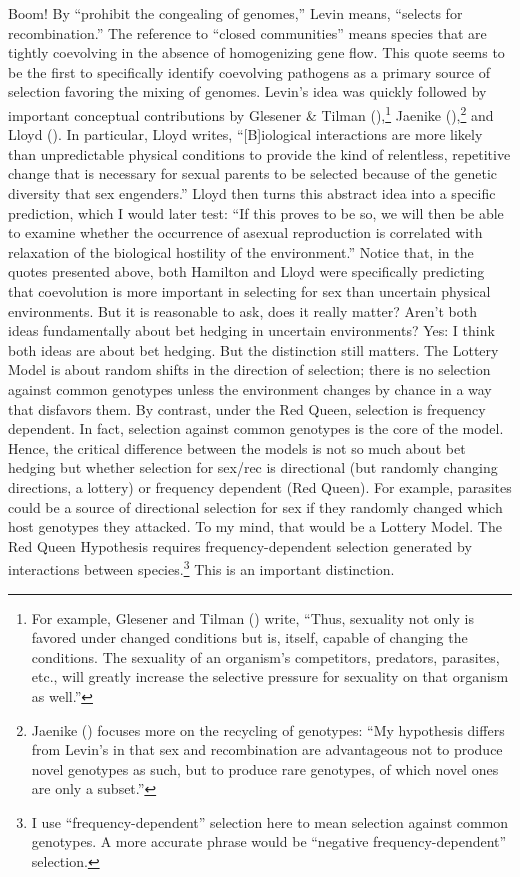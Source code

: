 \documentclass[
  letterpaper,
]{book}
\begin{document}
Boom! By ``prohibit the congealing of genomes,'' Levin means, ``selects
for recombination.'' The reference to ``closed communities'' means
species that are tightly coevolving in the absence of homogenizing gene
flow. This quote seems to be the first to specifically identify
coevolving pathogens as a primary source of selection favoring the
mixing of genomes. Levin's idea was quickly followed by important
conceptual contributions by Glesener \& Tilman
(),\footnote{For example, Glesener and
  Tilman () write, ``Thus, sexuality
  not only is favored under changed conditions but is, itself, capable
  of changing the conditions. The sexuality of an organism's
  competitors, predators, parasites, etc., will greatly increase the
  selective pressure for sexuality on that organism as well.''} Jaenike
(),\footnote{Jaenike
  () focuses more on the recycling of
  genotypes: ``My hypothesis differs from Levin's in that sex and
  recombination are advantageous not to produce novel genotypes as such,
  but to produce rare genotypes, of which novel ones are only a
  subset.''} and Lloyd (). In particular,
Lloyd writes, ``{[}B{]}iological interactions are more likely than
unpredictable physical conditions to provide the kind of relentless,
repetitive change that is necessary for sexual parents to be selected
because of the genetic diversity that sex engenders.'' Lloyd then turns
this abstract idea into a specific prediction, which I would later test:
``If this proves to be so, we will then be able to examine whether the
occurrence of asexual reproduction is correlated with relaxation of the
biological hostility of the environment.'' Notice that, in the quotes
presented above, both Hamilton and Lloyd were specifically predicting
that coevolution is more important in selecting for sex than uncertain
physical environments. But it is reasonable to ask, does it really
matter? Aren't both ideas fundamentally about bet hedging in uncertain
environments? Yes: I think both ideas are about bet hedging. But the
distinction still matters. The Lottery Model is about random shifts in
the direction of selection; there is no selection against common
genotypes unless the environment changes by chance in a way that
disfavors them. By contrast, under the Red Queen, selection is frequency
dependent. In fact, selection against common genotypes is the core of
the model. Hence, the critical difference between the models is not so
much about bet hedging but whether selection for sex/rec is directional
(but randomly changing directions, a lottery) or frequency dependent
(Red Queen). For example, parasites could be a source of directional
selection for sex if they randomly changed which host genotypes they
attacked. To my mind, that would be a Lottery Model. The Red Queen
Hypothesis requires frequency-dependent selection generated by
interactions between species.\footnote{I use ``frequency-dependent''
  selection here to mean selection against common genotypes. A more
  accurate phrase would be ``negative frequency-dependent'' selection.}
This is an important distinction.
\end{document}
